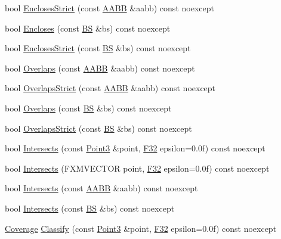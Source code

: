 \begin{DoxyCompactItemize}
\item 
bool \hyperlink{structmage_1_1_view_frustum_a7a0d293c4f3d1f29c54f45f00a7ca51f}{Encloses\+Strict} (const \hyperlink{structmage_1_1_a_a_b_b}{A\+A\+BB} \&aabb) const noexcept
\item 
bool \hyperlink{structmage_1_1_view_frustum_a779328d61928c60bfc0290d85eb79e4c}{Encloses} (const \hyperlink{structmage_1_1_b_s}{BS} \&bs) const noexcept
\item 
bool \hyperlink{structmage_1_1_view_frustum_a4300cf7690bc650ca521283496394997}{Encloses\+Strict} (const \hyperlink{structmage_1_1_b_s}{BS} \&bs) const noexcept
\item 
bool \hyperlink{structmage_1_1_view_frustum_a35c0afb66692cfd26a0e9bee2065892e}{Overlaps} (const \hyperlink{structmage_1_1_a_a_b_b}{A\+A\+BB} \&aabb) const noexcept
\item 
bool \hyperlink{structmage_1_1_view_frustum_a2eef224e458509eada25ec91a53753c6}{Overlaps\+Strict} (const \hyperlink{structmage_1_1_a_a_b_b}{A\+A\+BB} \&aabb) const noexcept
\item 
bool \hyperlink{structmage_1_1_view_frustum_ad7b492eaad1a93e650a8477045d5c0cb}{Overlaps} (const \hyperlink{structmage_1_1_b_s}{BS} \&bs) const noexcept
\item 
bool \hyperlink{structmage_1_1_view_frustum_a05963d6685c8cafc22be50c8e9b405df}{Overlaps\+Strict} (const \hyperlink{structmage_1_1_b_s}{BS} \&bs) const noexcept
\item 
bool \hyperlink{structmage_1_1_view_frustum_a7baa179995540134bced232579de7fc7}{Intersects} (const \hyperlink{structmage_1_1_point3}{Point3} \&point, \hyperlink{namespacemage_aa97e833b45f06d60a0a9c4fc22ae02c0}{F32} epsilon=0.\+0f) const noexcept
\item 
bool \hyperlink{structmage_1_1_view_frustum_a621efc234e605682e3ea5d98683e9a9e}{Intersects} (F\+X\+M\+V\+E\+C\+T\+OR point, \hyperlink{namespacemage_aa97e833b45f06d60a0a9c4fc22ae02c0}{F32} epsilon=0.\+0f) const noexcept
\item 
bool \hyperlink{structmage_1_1_view_frustum_a222e185f69a78f3c363423618f0a506d}{Intersects} (const \hyperlink{structmage_1_1_a_a_b_b}{A\+A\+BB} \&aabb) const noexcept
\item 
bool \hyperlink{structmage_1_1_view_frustum_a2925f619827d284c86ea5a68e694a8a8}{Intersects} (const \hyperlink{structmage_1_1_b_s}{BS} \&bs) const noexcept
\item 
\hyperlink{namespacemage_aa9fe157e5a578a103160266df8cccb0a}{Coverage} \hyperlink{structmage_1_1_view_frustum_ad93689c175655b62ccbc91304a59cb0b}{Classify} (const \hyperlink{structmage_1_1_point3}{Point3} \&point, \hyperlink{namespacemage_aa97e833b45f06d60a0a9c4fc22ae02c0}{F32} epsilon=0.\+0f) const noexcept

\end{DoxyCompactItemize}
